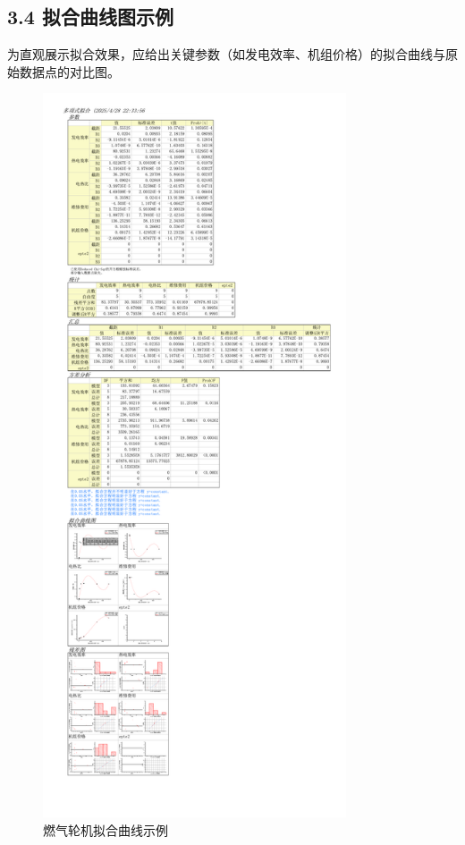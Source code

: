 \documentclass[12pt]{ctexart}
\begin{document}
\subsection{3.4 拟合曲线图示例}
为直观展示拟合效果，应给出关键参数（如发电效率、机组价格）的拟合曲线与原始数据点的对比图。
\begin{figure}[H]
  \centering
  \includegraphics[width=0.8\textwidth]{fig/实践2_内燃机_拟合曲线.pdf} %
  \caption{燃气轮机拟合曲线示例}
  \label{fig:price_fit}
\end{figure}
\end{document}
